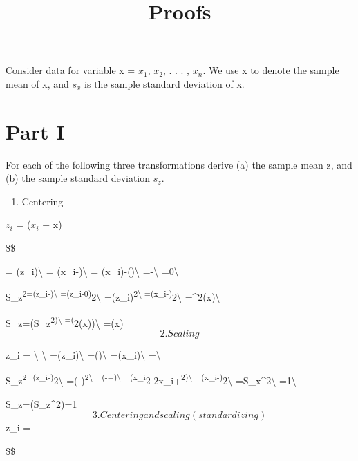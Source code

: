 \documentclass[]{article}
\title{Proofs}
\author{}
\date{\vspace{-2.5em}}
\providecommand{\tightlist}{%
  \setlength{\itemsep}{0pt}\setlength{\parskip}{0pt}}
\begin{document}
\maketitle

Consider data for variable x = \(x_1\), \(x_2\), . . . , \(x_n\). We use
x to denote the sample mean of x, and \(s_x\) is the sample standard
deviation of x.

\hypertarget{part-i}{%
\section{Part I}\label{part-i}}

For each of the following three transformations derive (a) the sample
mean z, and (b) the sample standard deviation \(s_z\).

\begin{enumerate}
\def\labelenumi{\arabic{enumi}.}
\tightlist
\item
  Centering
\end{enumerate}

\(z_i\) = (\(x_i\) − x)

\$\$

\def\zbar{\overline{z}}
\def\sumn{\sum_{i=1}^{n}}
\def\xbar{\overline{x}}

= \sum(z\_i)\textbackslash{} =
\sum(x\_i-)\textbackslash{} =
\sum(x\_i)-\sum()\textbackslash{}
=-\textbackslash{} =0\textbackslash{}

S\_z\textsuperscript{2=\sum(z\_i-)\textbackslash{}
=\sum(z\_i-0)}2\textbackslash{}
=\sum(z\_i)\textsuperscript{2\textbackslash{}
=\sum(x\_i-)}2\textbackslash{}
=\sigma\^{}2(x)\textbackslash{}

S\_z=\sqrt(S\_z\textsuperscript{2)\textbackslash{}
=\sqrt(\sigma}2(x))\textbackslash{} =\sigma(x) \[
2. Scaling
\]

z\_i = \textbackslash{} \textbackslash{}
=\sum(z\_i)\textbackslash{}
=\sum()\textbackslash{}
=\sum(x\_i)\textbackslash{}
=\textbackslash{}

S\_z\textsuperscript{2=\sum(z\_i-)}2\textbackslash{}
=\sum(-)\textsuperscript{2\textbackslash{}
=\sum(-+)\textbackslash{}
=\sum(x\_i}2-2x\_i+\textsuperscript{2)\textbackslash{}
=\sum(x\_i-)}2\textbackslash{}
=S\_x\^{}2\textbackslash{} =1\textbackslash{}

S\_z=\sqrt(S\_z\^{}2)=1 \[
3. Centering and scaling (standardizing)
\] z\_i =  \[
\]

\$\$
\end{document}
